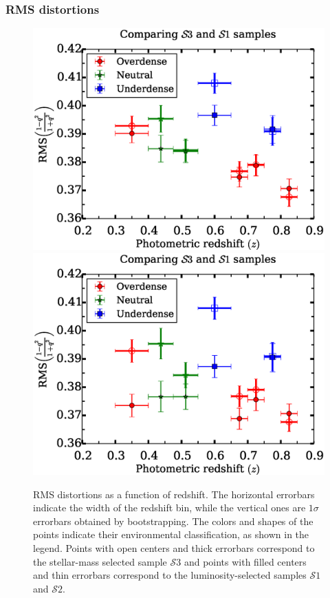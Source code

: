 \documentclass[twocolumn,useAMS,usenatbib]{mn2e}
\newcommand{\s}{\ensuremath{\mathcal{S}}}
\begin{document}
\subsubsection{RMS distortions}
\begin{figure}
 \centering
 \includegraphics[width=1.0\columnwidth]{rms_ellip2_noevolution.eps} \\
 \includegraphics[width=1.0\columnwidth]{rms_ellip2_Bbandevolution.eps} \\
 \caption{RMS distortions as a function of redshift. The horizontal errorbars indicate
          the width of the redshift bin, while the vertical ones
          are $1\sigma$ errorbars obtained by
          bootstrapping. The colors and shapes of the points indicate their
          environmental classification, as shown in the legend. Points with open centers and thick errorbars correspond to the stellar-mass selected sample \s$3$
          and points with filled centers and thin errorbars correspond to the luminosity-selected samples \s$1$ and \s$2$.             
          }
 \label{fig:rms_ellip}


\end{figure}
\end{document}
